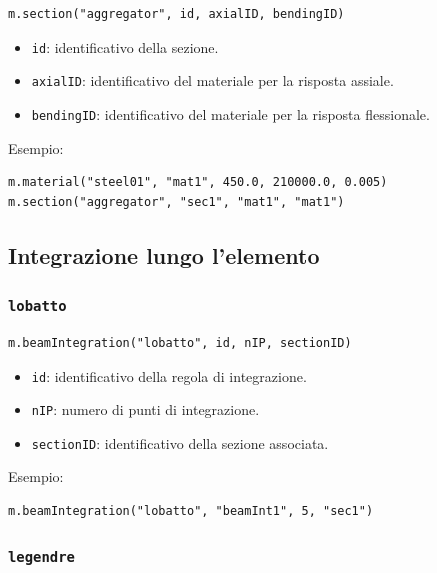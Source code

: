 \documentclass[11pt,a4paper]{article}
\begin{document}
\begin{lstlisting}[style=pythonstyle]
m.section("aggregator", id, axialID, bendingID)
\end{lstlisting}

\begin{itemize}
    \item \texttt{id}: identificativo della sezione.
    \item \texttt{axialID}: identificativo del materiale per la risposta assiale.
    \item \texttt{bendingID}: identificativo del materiale per la risposta flessionale.
\end{itemize}

Esempio:

\begin{lstlisting}[style=pythonstyle]
m.material("steel01", "mat1", 450.0, 210000.0, 0.005)
m.section("aggregator", "sec1", "mat1", "mat1")
\end{lstlisting}

\subsection{Integrazione lungo l'elemento}

\subsubsection{\texttt{lobatto}}

\begin{lstlisting}[style=pythonstyle]
m.beamIntegration("lobatto", id, nIP, sectionID)
\end{lstlisting}

\begin{itemize}
    \item \texttt{id}: identificativo della regola di integrazione.
    \item \texttt{nIP}: numero di punti di integrazione.
    \item \texttt{sectionID}: identificativo della sezione associata.
\end{itemize}

Esempio:

\begin{lstlisting}[style=pythonstyle]
m.beamIntegration("lobatto", "beamInt1", 5, "sec1")
\end{lstlisting}

\subsubsection{\texttt{legendre}}
\end{document}
